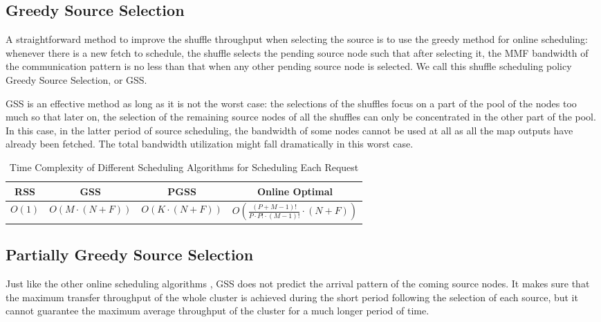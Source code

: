 \documentclass[10pt,journal,compsoc]{IEEEtran}
\begin{document}
\subsection{Greedy Source Selection}
A straightforward method to improve the shuffle throughput when
selecting the source is
to use the greedy method for online scheduling: 
whenever there is a new fetch to schedule, the shuffle selects the
pending source node such that after selecting it,
the MMF bandwidth of the communication pattern is no less
than that
when any other pending source node is selected. We call this shuffle
scheduling policy Greedy Source Selection, or GSS.


GSS is an effective method as long as it is not the
worst case:
the selections of the shuffles focus on a part of the pool of the
nodes too much
so that later on, the selection of the remaining source nodes of all
the shuffles can only be concentrated in the other part of the pool.
In this case, in the latter period of source scheduling,
the bandwidth of some nodes cannot be used at all as all the map
outputs have already been fetched.
The total bandwidth utilization might fall dramatically in this worst case. 

\begin{table}[!t]
\renewcommand{\arraystretch}{1}
\setlength\tabcolsep{1.5pt}
\caption{Time Complexity of Different Scheduling Algorithms for Scheduling Each Request}
\label{table:complexity}
\centering
\begin{tabularx}{.47\textwidth}{c|c|c|c}
\hline
\textbf{RSS} & \textbf{GSS} & \textbf{PGSS} &\textbf{Online Optimal}\\
\hline
$O(1)$ & $O(M \cdot (N+F))$ &
$O(K \cdot (N+F))$ &$O(\frac{(P+M-1)!}{P \cdot P! \cdot(M-1)!} \cdot (N+F))$\\
\hline
\end{tabularx}
\end{table}

\subsection{Partially Greedy Source Selection}
Just like the other online scheduling algorithms \cite{wu2007scheduling, sgall1998line}, 
GSS does not predict the arrival pattern of the coming source nodes. 
It makes sure that the maximum transfer throughput of the whole
cluster is achieved during the short period
following the selection of each source,
but it cannot guarantee the maximum average throughput of the cluster
for a much longer period of time.
\end{document}
